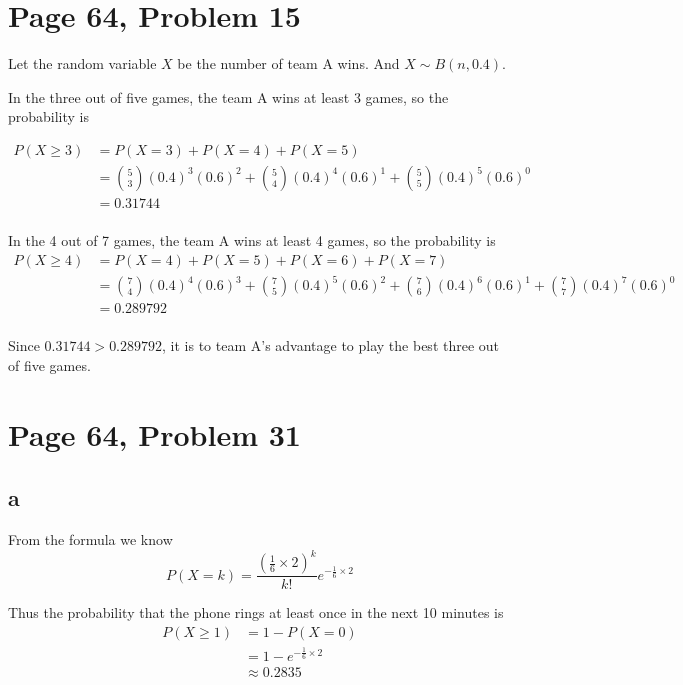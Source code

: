 \documentclass[a4paper, UTF-8]{article}
\theoremstyle{plain}
\begin{document}
\section{Page 64, Problem 15}

Let the random variable $X$ be the number of team A wins. And $X \sim B(n, 0.4)$.  

In the three out of five games, the team A wins at least 3 games, so the probability is 

\begin{align*}
P(X \geq 3) &= P(X=3) + P(X=4) + P(X=5) \\
            &= \binom{5}{3} (0.4)^3 (0.6)^2 + \binom{5}{4} (0.4)^4 (0.6)^1 + \binom{5}{5} (0.4)^5 (0.6)^0 \\
            &= 0.31744 \\
\end{align*}

In the 4 out of 7 games, the team A wins at least 4 games, so the probability is
\begin{align*}
P(X \geq 4) &= P(X=4) + P(X=5) + P(X=6) + P(X=7) \\
            &= \binom{7}{4} (0.4)^4 (0.6)^3 + \binom{7}{5} (0.4)^5 (0.6)^2 + \binom{7}{6} (0.4)^6 (0.6)^1 + \binom{7}{7} (0.4)^7 (0.6)^0 \\
            &= 0.289792 \\
\end{align*}

Since $0.31744 > 0.289792$, it is to team A's advantage to play the best three out of five games.

\section{Page 64, Problem 31}

\subsection{a} 

From the formula we know
$$
P(X = k) = \frac{(\frac{1}{6} \times 2)^k}{k!}e^{-\frac{1}{6} \times 2} 
$$

Thus the probability that the phone rings at least once in the next 10 minutes is
\begin{align*}
P(X \geq 1) &= 1 - P(X=0) \\
            &= 1 - e^{-\frac{1}{6} \times 2} \\
            &\approx 0.2835
\end{align*}
\end{document}
